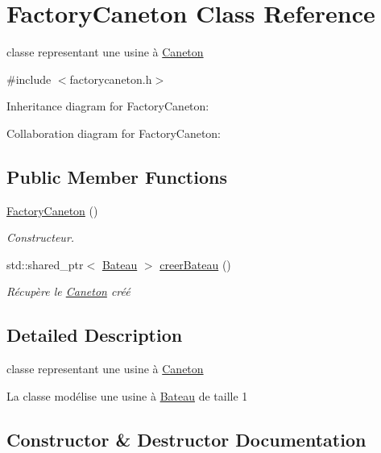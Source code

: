 \hypertarget{class_factory_caneton}{}\section{Factory\+Caneton Class Reference}
\label{class_factory_caneton}


classe representant une usine à \hyperlink{class_caneton}{Caneton}  




{\ttfamily \#include $<$factorycaneton.\+h$>$}



Inheritance diagram for Factory\+Caneton\+:


Collaboration diagram for Factory\+Caneton\+:
\subsection*{Public Member Functions}
\begin{DoxyCompactItemize}
\item 
\hyperlink{class_factory_caneton_aaf555e37dcffbab41199d886a894fd84}{Factory\+Caneton} ()
\begin{DoxyCompactList}\small\item\em Constructeur. \end{DoxyCompactList}\item 
std\+::shared\+\_\+ptr$<$ \hyperlink{class_bateau}{Bateau} $>$ \hyperlink{class_factory_caneton_ac03710919dab69d816bb4c8fd047f4eb}{creer\+Bateau} ()
\begin{DoxyCompactList}\small\item\em Récupère le \hyperlink{class_caneton}{Caneton} créé \end{DoxyCompactList}\end{DoxyCompactItemize}


\subsection{Detailed Description}
classe representant une usine à \hyperlink{class_caneton}{Caneton} 

La classe modélise une usine à \hyperlink{class_bateau}{Bateau} de taille 1 

\subsection{Constructor \& Destructor Documentation}

